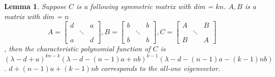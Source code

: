 \documentclass{ctexart}
\newtheorem{lemma}{Lemma}
\begin{document}
\begin{lemma}\label{lem:Cabd2}
	Suppose $C$ is a following symmetric matrix with dim = $kn$.
	$A, B$ is a matrix with dim = $n$
	$$A=\begin{bmatrix}
	d & \text{ } & a \\
	& \ddots & \\
	a & \text{ } & d 
	\end{bmatrix},
	B=\begin{bmatrix}
	b & \text{ } & b \\
	& \ddots & \\
	b & \text{ } & b 
	\end{bmatrix},
	 C=\begin{bmatrix} 
	 	A & \text{ } & B \\
	 & \ddots & \\
	 B & \text{ } & A 
	\end{bmatrix}$$,
	then the characteristic polynomial function of $C$ is $(\lambda - d + a)^{kn-k} (\lambda - d - (n-1)a + nb)^{k-1}
	(\lambda - d - (n-1)a -(k-1)nb)$. $d + (n-1)a + (k-1)nb$ corresponds to the all-one eigenvector.
\end{lemma}
\end{document}
